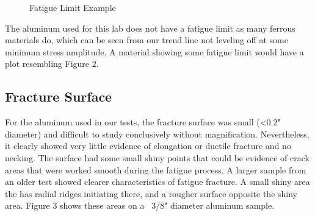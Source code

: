 \documentclass{article}
\begin{document}
\pagebreak
\begin{figure}
\centering
    \caption{Fatigue Limit Example}
    \label{tab:graph1}
\end{figure}
The aluminum used for this lab does not have a fatigue limit as many ferrous materials do, which can be seen from our trend line not leveling off at some minimum stress amplitude. A material showing some fatigue limit would have a plot resembling Figure 2.
\subsection{Fracture Surface}

For the aluminum used in our tests, the fracture surface was small (<0.2" diameter) and difficult to study conclusively without magnification. Nevertheless, it clearly showed very little evidence of elongation or ductile fracture and no necking. The surface had some small shiny points that could be evidence of crack areas that were worked smooth during the fatigue process. A larger sample from an older test showed clearer characteristics of fatigue fracture. A small shiny area the has radial ridges initiating there, and a rougher surface opposite the shiny area. Figure 3 shows these areas on a ~3/8" diameter aluminum sample.
\end{document}

